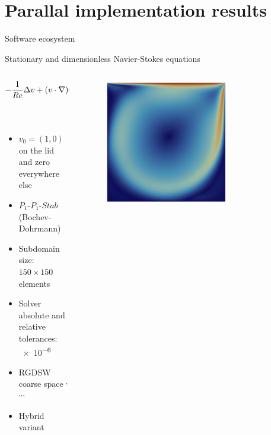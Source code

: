 \section{Parallal implementation results}

\begin{frame}{Software ecosystem}
	
\end{frame}

\begin{frame}{Stationary and dimensionless Navier-Stokes equations}
	\vspace{-5mm}
	\begin{columns}
		\begin{column}{0.6\textwidth}%
			\begin{align*}
				-\frac{1}{Re} \Delta v + (v \cdot \nabla)v + \nabla p & = 0 \;   & {\rm in}\; \Omega           \\
				{\rm div}(v)                                          & = 0 \;   & {\rm in} \; \Omega          \\
				v                                                     & = v_0 \; & {\rm on} \; \partial \Omega
			\end{align*}
			\vspace{-4mm}
			\begin{itemize}
				\item $v_0=(1,0)$ on the lid and zero everywhere else
				\item $P_1\textrm{-}P_1\textrm{-}Stab$ (Bochev-Dohrmann) \footnotemark{}
				\item Subdomain size: $150\times 150$ elements
				\item Solver absolute and relative tolerances: \num{e-6}
        \item RGDSW coarse space \footnotemark[6]$^,$\footnotemark[7]$^,$\footnotemark[8]$^,$\footnotemark[9]$^,$\footnotemark[10]
                \item Hybrid variant
			\end{itemize}
		\end{column}
		\begin{column}{0.4\textwidth}
			\begin{figure}
				\centering
				\includegraphics[width=0.7\textwidth]{images/ldc.png}

\end{figure}
\end{column}
\end{columns}
\end{frame}
